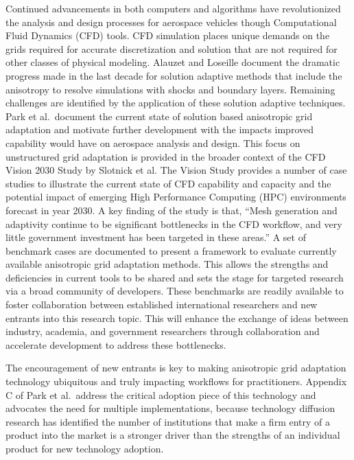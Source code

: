 \documentclass[3p,times,procedia,number]{elsarticle}
\begin{document}
Continued advancements in both computers and algorithms
have revolutionized the analysis and design processes for
aerospace vehicles though Computational Fluid Dynamics (CFD) tools.
CFD simulation places unique demands on the grids required for
accurate discretization and solution that are not required
for other classes of physical modeling.
Alauzet and Loseille\cite{alauzet-loseille-decade-aniso-adapt-cfd}
document the dramatic progress made in the last decade
for solution adaptive methods that include the anisotropy to
resolve simulations with shocks and boundary layers.
Remaining challenges are identified
by the application of these solution adaptive techniques.
Park et al.\cite{park-unstruct-adapt-status-cfd2030}~document
the current state of solution based anisotropic
grid adaptation and motivate further development with
the impacts improved capability would have on
aerospace analysis and design.
This focus on unstructured grid adaptation
is provided in the broader context of the
CFD Vision 2030 Study by Slotnick et al.\cite{cfd-vision-2030}
The Vision Study provides a number of case studies
to illustrate the current state of CFD capability and capacity and the
potential impact of emerging High Performance Computing (HPC)
environments forecast in year 2030.
A key finding of the study is that,
``Mesh generation and adaptivity continue to be significant bottlenecks
in the CFD workflow, and very little government investment has been targeted
in these areas.''\cite{cfd-vision-2030}
A set of benchmark cases are documented to present a framework to evaluate
currently available anisotropic grid adaptation methods.
This allows the strengths and deficiencies in current tools to be shared
and sets the stage for targeted research via a broad community of developers.
These benchmarks are readily available to foster collaboration
between established international researchers and new
entrants into this research topic.
This will enhance the exchange of ideas between
industry, academia, and government researchers through collaboration
and accelerate development to address these bottlenecks.

The encouragement of new entrants is key to making
anisotropic grid adaptation technology ubiquitous and truly impacting
workflows for practitioners.
Appendix C of Park et al.\cite{park-unstruct-adapt-status-cfd2030}~address
the critical adoption piece of this technology and
advocates the need for multiple implementations,
because technology diffusion research has identified the
number of institutions that make a firm entry of a product
into the market is a stronger driver than the strengths of an individual
product for new technology
adoption.\cite{agarwal-bayus-market-evo-takeoff-innovation}
\end{document}
